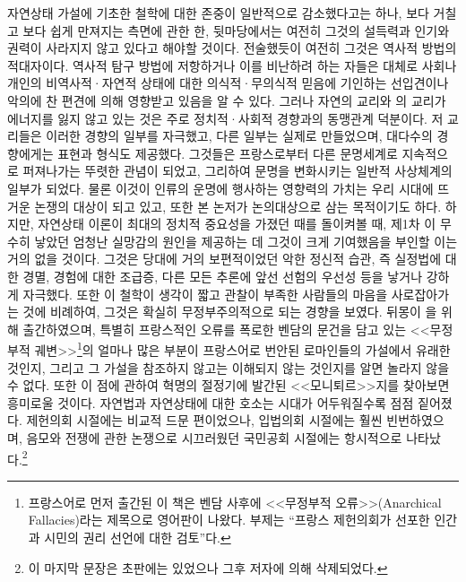 자연상태 가설에 기초한 철학에 대한 존중이 일반적으로 감소했다고는 하나,
보다 거칠고 보다 쉽게 만져지는 측면에 관한 한,
뒷마당에서는 여전히 그것의 설득력과 인기와 권력이 사라지지 않고 있다고
해야할 것이다.
전술했듯이 여전히 그것은 역사적 방법의 적대자이다.
역사적 탐구 방법에  저항하거나
이를 비난하려 하는 자들은
대체로 사회나 개인의 비역사적^^b7자연적 상태에 대한 의식적^^b7무의식적
믿음에 기인하는 선입견이나 악의에 찬 편견에 의해 영향받고 있음을 알 수 있다.
그러나 자연의 교리와 의 교리가 에너지를 잃지 않고 있는 것은
주로 정치적^^b7사회적 경향과의 동맹관계 덕분이다.
저 교리들은 이러한 경향의 일부를 자극했고, 다른 일부는 실제로 만들었으며,
대다수의 경향에게는 표현과 형식도 제공했다.
그것들은 프랑스로부터 다른 문명세계로 지속적으로 퍼져나가는 뚜렷한 관념이
되었고, 그리하여 문명을 변화시키는 일반적 사상체계의 일부가 되었다.
물론 이것이 인류의 운명에 행사하는 영향력의 가치는 우리 시대에
뜨거운 논쟁의 대상이 되고 있고, 또한 본 논저가 논의대상으로 삼는
목적이기도 하다.
하지만, 자연상태 이론이 최대의 정치적 중요성을 가졌던 때를 돌이켜볼 때,
제1차 이 무수히 낳았던 엄청난 실망감의 원인을 제공하는 데
그것이 크게
기여했음을 부인할 이는 거의 없을 것이다.
그것은 당대에 거의 보편적이었던 악한 정신적 습관, 즉
실정법에 대한 경멸, 경험에 대한 조급증,
다른 모든 추론에 앞선 선험의 우선성 등을 낳거나
강하게 자극했다.
또한 이 철학이 생각이 짧고 관찰이 부족한 사람들의 마음을
사로잡아가는 것에 비례하여, 그것은 확실히 무정부주의적으로 되는 경향을 보였다.
뒤몽이 을 위해 출간하였으며,
특별히 프랑스적인 오류를 폭로한 벤담의 문건을 담고 있는
<<무정부적 궤변>>\footnote{%
  프랑스어로 먼저 출간된 이 책은
  벤담 사후에 <<무정부적 오류>>(Anarchical Fallacies)라는 제목으로
  영어판이 나왔다. 부제는
  ``프랑스 제헌의회가 선포한 인간과 시민의 권리 선언에 대한 검토''다.}의
얼마나 많은 부분이
프랑스어로 번안된 로마인들의 가설에서 유래한 것인지, 그리고
그 가설을 참조하지 않고는 이해되지 않는 것인지를 알면 놀라지 않을 수 없다.
또한 이 점에 관하여 혁명의 절정기에 발간된 <<모니퇴르>>지를
찾아보면 흥미로울 것이다.
자연법과 자연상태에 대한 호소는 시대가 어두워질수록 점점 짙어졌다.
제헌의회 시절에는 비교적 드문 편이었으나,
입법의회 시절에는 훨씬 빈번하였으며,
음모와 전쟁에 관한 논쟁으로 시끄러웠던 국민공회 시절에는
항시적으로 나타났다.\footnote{%
  이 마지막 문장은 초판에는 있었으나 그후 저자에 의해 삭제되었다.}

